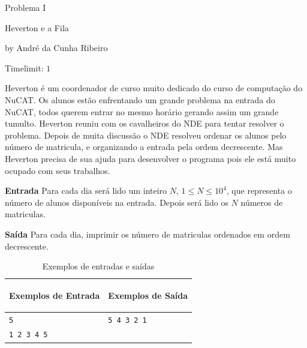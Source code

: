\begin{center}
Problema I

Heverton e a Fila 

{\tiny by André da Cunha Ribeiro}

Timelimit: $1$	
\end{center}			

Heverton é um coordenador de curso muito dedicado do curso de computação do NuCAT. Os alunos estão enfrentando um grande problema na entrada do NuCAT, todos querem entrar no mesmo horário gerando assim um grande tumulto. Heverton reuniu com os cavalheiros do NDE para tentar resolver o problema. Depois de muita discussão o NDE resolveu ordenar os alunos pelo número de matricula, e organizando a entrada pela ordem decrescente. Mas Heverton precisa de sua ajuda para desenvolver o programa pois ele está muito ocupado com seus trabalhos.

\vspace{0.3cm}
\textbf{Entrada}
Para cada dia será lido um inteiro $N$, $1 \leq  N  \leq  10^{4}$, que representa o número de alunos disponíveis na entrada. Depois será lido os $N$ números de matriculas.

\vspace{0.3cm}
\textbf{Saída}
Para cada dia, imprimir os  número de  matriculas ordenados em ordem decrescente.

\begin{table}[h]
    \centering
    \begin{tabular}{|p{7cm}|p{7cm}|}
        \hline
        \begin{center}
            \vspace{-0.3cm}
            \textbf{Exemplos de Entrada}
            \vspace{-0.3cm}
        \end{center} 
         &  
        \begin{center}
            \vspace{-0.3cm}
            \textbf{Exemplos de Saída}
            \vspace{-0.3cm}
        \end{center} \\ \hline
         \texttt{5} & \texttt{5 4 3 2 1} \\  
         \texttt{1 2 3 4 5} & \texttt{} \\
         \hline
    \end{tabular}
    \caption{Exemplos de entradas e saídas}
    \label{tab:inputI2}
\end{table}

\newpage

\begin{center}
\noindent

\end{center}
